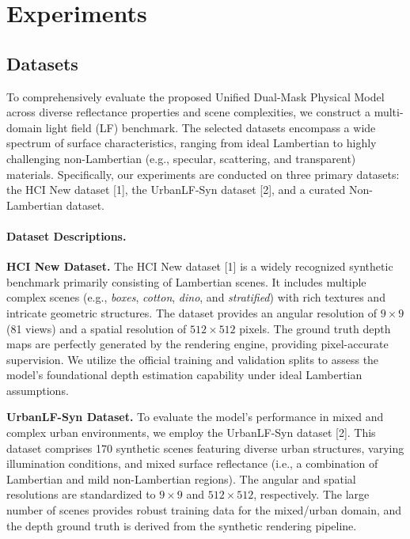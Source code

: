 \section{Experiments}

\subsection{Datasets}

To comprehensively evaluate the proposed Unified Dual-Mask Physical Model across diverse reflectance properties and scene complexities, we construct a multi-domain light field (LF) benchmark. The selected datasets encompass a wide spectrum of surface characteristics, ranging from ideal Lambertian to highly challenging non-Lambertian (e.g., specular, scattering, and transparent) materials. Specifically, our experiments are conducted on three primary datasets: the HCI New dataset [1], the UrbanLF-Syn dataset [2], and a curated Non-Lambertian dataset.

\paragraph{Dataset Descriptions.}

\textbf{HCI New Dataset.} The HCI New dataset [1] is a widely recognized synthetic benchmark primarily consisting of Lambertian scenes. It includes multiple complex scenes (e.g., \textit{boxes}, \textit{cotton}, \textit{dino}, and \textit{stratified}) with rich textures and intricate geometric structures. The dataset provides an angular resolution of $9 \times 9$ (81 views) and a spatial resolution of $512 \times 512$ pixels. The ground truth depth maps are perfectly generated by the rendering engine, providing pixel-accurate supervision. We utilize the official training and validation splits to assess the model's foundational depth estimation capability under ideal Lambertian assumptions.

\textbf{UrbanLF-Syn Dataset.} To evaluate the model's performance in mixed and complex urban environments, we employ the UrbanLF-Syn dataset [2]. This dataset comprises 170 synthetic scenes featuring diverse urban structures, varying illumination conditions, and mixed surface reflectance (i.e., a combination of Lambertian and mild non-Lambertian regions). The angular and spatial resolutions are standardized to $9 \times 9$ and $512 \times 512$, respectively. The large number of scenes provides robust training data for the mixed/urban domain, and the depth ground truth is derived from the synthetic rendering pipeline.

